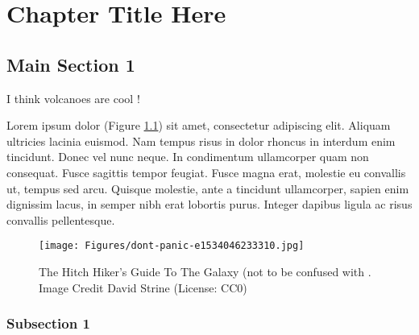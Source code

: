
\chapter{Chapter Title Here}\label{chapter:firstchapter} %

\label{ChapterX} %


\section{Main Section 1}\label{sec:firstsection}

I think volcanoes are cool \cite{robock2000volcanic}!

Lorem ipsum dolor (Figure \ref{fig:ThisFig}) sit amet, consectetur adipiscing elit\cite{fleischman1994pragmatics}.
Aliquam ultricies lacinia euismod.
Nam tempus risus in dolor rhoncus in interdum enim tincidunt.
Donec vel nunc neque.
In condimentum ullamcorper quam non consequat.
Fusce sagittis tempor feugiat.
Fusce magna erat, molestie eu convallis ut, tempus sed arcu.
Quisque molestie, ante a tincidunt ullamcorper, sapien enim dignissim lacus, in semper nibh erat lobortis purus.
Integer dapibus ligula ac risus convallis pellentesque.

\begin{figure}
\begin{centering}
\texttt{[image: Figures/dont-panic-e1534046233310.jpg]}
\caption{The Hitch Hiker's Guide To The Galaxy (not to be confused with \cite{Reference1}. Image Credit David Strine (License: CC0)}
\label{fig:ThisFig}
\end{centering}
\end{figure}

\subsection{Subsection 1}

